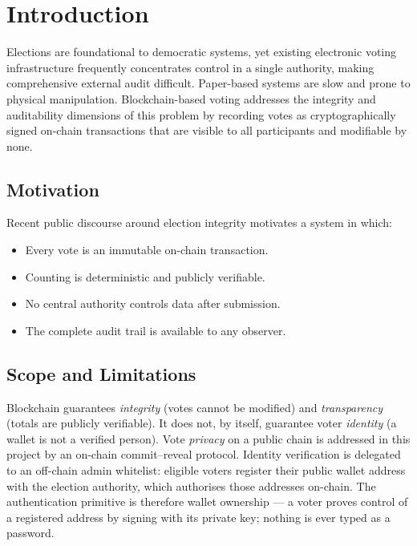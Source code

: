 \documentclass[11pt]{article}
\begin{document}
\section{Introduction}

Elections are foundational to democratic systems, yet existing electronic voting
infrastructure frequently concentrates control in a single authority, making
comprehensive external audit difficult. Paper-based systems are slow and prone to
physical manipulation. Blockchain-based voting addresses the integrity and auditability
dimensions of this problem by recording votes as cryptographically signed on-chain
transactions that are visible to all participants and modifiable by none.

\subsection{Motivation}
Recent public discourse around election integrity motivates a system in which:
\begin{itemize}[nosep]
  \item Every vote is an immutable on-chain transaction.
  \item Counting is deterministic and publicly verifiable.
  \item No central authority controls data after submission.
  \item The complete audit trail is available to any observer.
\end{itemize}

\subsection{Scope and Limitations}
Blockchain guarantees \emph{integrity} (votes cannot be modified) and \emph{transparency}
(totals are publicly verifiable). It does not, by itself, guarantee voter \emph{identity}
(a wallet is not a verified person). Vote \emph{privacy} on a public chain is addressed in
this project by an on-chain commit--reveal protocol. Identity verification is delegated to
an off-chain admin whitelist: eligible voters register their public wallet address with the
election authority, which authorises those addresses on-chain. The authentication primitive
is therefore wallet ownership --- a voter proves control of a registered address by signing
with its private key; nothing is ever typed as a password.

\end{document}

